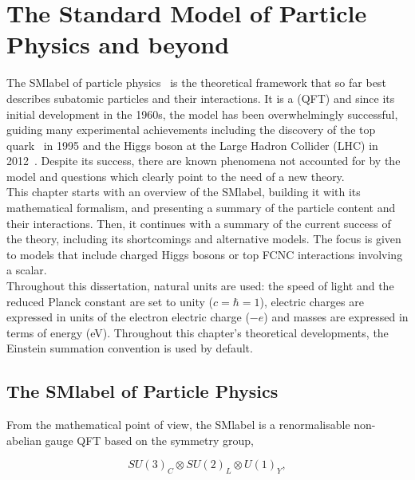 \chapter{The Standard Model of Particle Physics and beyond}
\label{chapter:SM}

The \acrfull{SMlabel} of particle physics~\cite{PhysRevLett.19.1264,GLASHOW1961579,RevModPhys.52.525} is the theoretical framework
that so far best describes subatomic particles and their interactions.
It is a  (\acrshort{QFT}) and since its initial development in the 1960s,
the model has been overwhelmingly successful, guiding many experimental achievements
including the discovery of the top quark~\cite{topsearch1995,PhysRevLett.74.2626} in 1995
and the Higgs boson at the Large Hadron Collider (LHC) in 2012~\cite{ATLASHiggs2012,CMShiggs2012}.
Despite its success, there are known phenomena not accounted for by the model
and questions which clearly point to the need of a new theory.\\

This chapter starts with an overview of the \acrshort{SMlabel}, building it with its mathematical formalism, and presenting a summary of the particle content and their interactions. Then, it continues with a summary of the current success of the theory, including its shortcomings and alternative models. The focus is given to models that include charged Higgs bosons or top FCNC interactions involving a scalar.\\

Throughout this dissertation, natural units are used: the speed of light and the reduced Planck constant are set to unity ($c=\hbar=1$),
electric charges are expressed in units of the electron electric charge ($-e$) and masses are expressed in terms of energy (eV). Throughout this chapter's theoretical developments, the Einstein summation convention is used by default.

\section{The \acrlong{SMlabel} of Particle Physics}

From the mathematical point of view, the \acrshort{SMlabel} is a renormalisable non-abelian gauge \acrshort{QFT} based on the
symmetry group, 

\begin{equation}
    \label{Theory_eq:SMgroup}
    SU(3)_C\otimes SU(2)_L\otimes U(1)_Y,
\end{equation}

